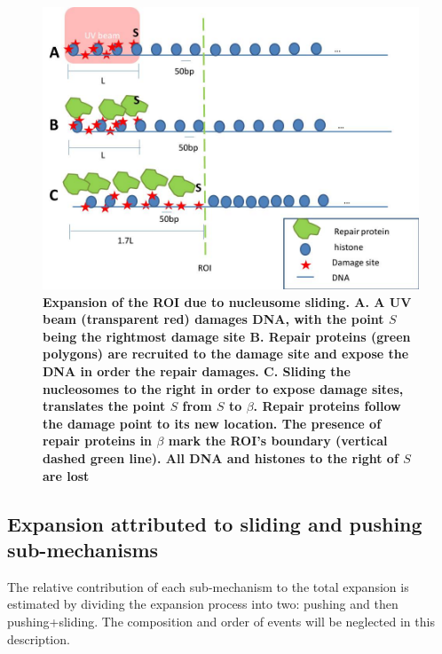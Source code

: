 \documentclass[12pt]{report}
\begin{document}
				   \begin{figure}[H]
				   	\centering
				   	\includegraphics[width=0.7\linewidth]{Images/SlidingModel/histoneSlidingMulti}
				   	\caption{\tiny{\textbf{Expansion of the ROI due to nucleusome sliding. \textbf{A}. A UV beam (transparent red) damages DNA, with the point $S$ being the rightmost damage site \textbf{B}. Repair proteins (green polygons) are recruited to the damage site and expose the DNA in order the repair damages. \textbf{C}. Sliding the nucleosomes to the right in order to expose damage sites, translates the point $S$ from $S$ to $\beta$. Repair proteins follow the damage point to its new location. The presence of repair proteins in $\beta$ mark the ROI's boundary (vertical dashed green line). All DNA and histones to the right of $S$ are lost}}}
				   	\label{fig:histoneSlidingMulti}
				   \end{figure}
		
								
		\subsection{Expansion attributed to sliding and pushing sub-mechanisms}\label{subsection:ExpansionDueToSlidingAndPushing}
		The relative contribution of each sub-mechanism to the total expansion is estimated by dividing the expansion process into two: pushing and then pushing+sliding. The composition and order of events will be neglected in this description. 
		
\end{document}
